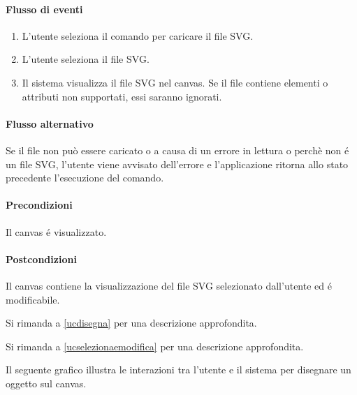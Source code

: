 \paragraph{Flusso di eventi}
\begin{enumerate}
\item L'utente seleziona il comando per caricare il file SVG.
\item L'utente seleziona il file SVG.
\item Il sistema visualizza il file SVG nel canvas. Se il file contiene elementi o attributi non supportati, essi saranno ignorati.
\end{enumerate}
\paragraph{Flusso alternativo}
Se il file non pu\`o essere caricato o a causa di un errore in lettura o perch\`e non \'e un file SVG, l'utente viene avvisato dell'errore e l'applicazione ritorna allo stato precedente l'esecuzione del comando.
\paragraph{Precondizioni} Il canvas \'e visualizzato.
\paragraph{Postcondizioni} Il canvas contiene la visualizzazione del file SVG selezionato dall'utente ed \'e modificabile.

Si rimanda a \ref{ucdisegna} per una descrizione approfondita.

Si rimanda a \ref{ucselezionaemodifica} per una descrizione approfondita.

\label{ucdisegna}
Il seguente grafico illustra le interazioni tra l'utente e il sistema per disegnare un oggetto sul canvas.

